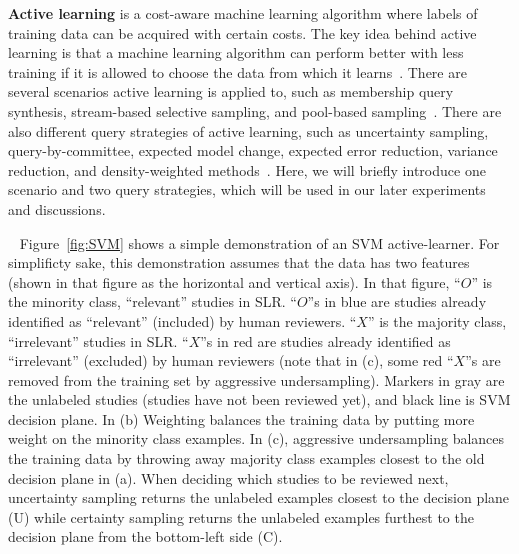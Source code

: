 \documentclass{svjour3}
\theoremstyle{break}
\newcommand{\respto}[1]{
\fcolorbox{black}{black!15}{
\label{response:#1}
\bf
  \scriptsize R-{#1}}~
}
\begin{document}
\textbf{Active learning} is a cost-aware machine learning algorithm where labels of training data can be acquired with certain costs. The key idea behind active learning is that a machine learning algorithm can perform better with less
training if it is allowed to choose the data from which it learns~\cite{settles2012active}. There are several scenarios active learning is applied to, such as membership query synthesis, stream-based selective sampling, and pool-based sampling~\cite{settles2010active}. There are also different query strategies of active learning, such as uncertainty sampling, query-by-committee, expected model change, expected error reduction, variance reduction, and density-weighted methods~\cite{settles2010active}. Here, we will briefly introduce one scenario and two query strategies, which will be used in our later experiments and discussions.
 

\respto{1g}Figure~\ref{fig:SVM} shows a simple demonstration of an SVM active-learner.
For simplificty sake, this demonstration assumes that the data has    two features (shown in that figure as the horizontal and vertical axis). 
 In that figure, ``$O$'' is the minority class, ``relevant'' studies in SLR. ``$O$''s in blue are studies already identified as ``relevant'' (included) by human reviewers. ``$X$'' is the majority class, ``irrelevant'' studies in SLR. ``$X$''s in red are studies already identified as ``irrelevant'' (excluded) by human reviewers (note that in (c), some red ``$X$''s are removed from the training set by aggressive undersampling). Markers in gray are the unlabeled studies (studies have not been reviewed yet), and black line is SVM decision plane. In (b) Weighting balances the training data by putting more weight on the minority class examples. In (c), aggressive undersampling balances the training data by throwing away majority class examples closest to the old decision plane in (a). When deciding which studies to be reviewed next, uncertainty sampling returns the unlabeled examples closest to the decision plane (U) while certainty sampling returns the unlabeled examples furthest to the decision plane from the bottom-left side (C).
\end{document}
